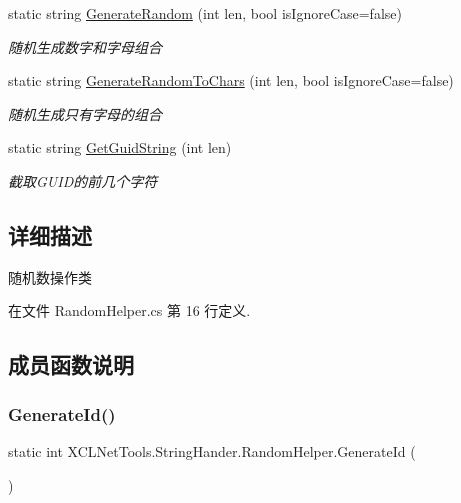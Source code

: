\begin{DoxyCompactItemize}
static string \hyperlink{class_x_c_l_net_tools_1_1_string_hander_1_1_random_helper_ac38cfc64a02c7fce9c3d409674631151}{Generate\+Random} (int len, bool is\+Ignore\+Case=false)
\begin{DoxyCompactList}\small\item\em 随机生成数字和字母组合 \end{DoxyCompactList}\item 
static string \hyperlink{class_x_c_l_net_tools_1_1_string_hander_1_1_random_helper_a9ed024bc1394d4af540928ea190a4d43}{Generate\+Random\+To\+Chars} (int len, bool is\+Ignore\+Case=false)
\begin{DoxyCompactList}\small\item\em 随机生成只有字母的组合 \end{DoxyCompactList}\item 
static string \hyperlink{class_x_c_l_net_tools_1_1_string_hander_1_1_random_helper_a0cfdcb45e5ab319ad34c3dc07f568dd9}{Get\+Guid\+String} (int len)
\begin{DoxyCompactList}\small\item\em 截取\+G\+U\+I\+D的前几个字符 \end{DoxyCompactList}\end{DoxyCompactItemize}


\subsection{详细描述}
随机数操作类 



在文件 Random\+Helper.\+cs 第 16 行定义.



\subsection{成员函数说明}
\mbox{\label{class_x_c_l_net_tools_1_1_string_hander_1_1_random_helper_adfcadc291d76f970c4d422210794f8ac}} 
\subsubsection{\texorpdfstring{Generate\+Id()}{GenerateId()}}
{\footnotesize\ttfamily static int X\+C\+L\+Net\+Tools.\+String\+Hander.\+Random\+Helper.\+Generate\+Id (\begin{DoxyParamCaption}{ }\end{DoxyParamCaption})\hspace{0.3cm}{\ttfamily [static]}}



